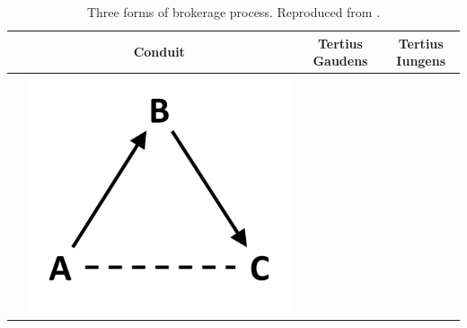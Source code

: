 \begin{table}[]
\small
\centering
\caption{Three forms of brokerage process. Reproduced from \citet{obstfeld2014brokerage}.}
\label{brokerage}
\begin{tabularx}{\textwidth}{p{3.5cm}p{3.5cm}p{3.5cm}p{3.5cm}}
	\toprule
	& \multicolumn{1}{c}{Conduit} & \multicolumn{1}{c}{Tertius Gaudens} & \multicolumn{1}{c}{Tertius Iungens} \\ \midrule
	& \begin{minipage}{.2\textwidth} \centering \includegraphics[width=0.7\linewidth]{Images/CDT_brokerage} \end{minipage}  & \begin{minipage}{.2\textwidth} \centering 
\end{tabularx}
\end{table}
